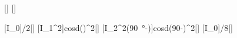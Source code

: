 [\W\per\m\squared]
[\degree]

[I_0]{\IoX/2}[\W\per\m\squared]
[I_1\cos^2\theta]{\IuX*cosd(\alX)^2}[\W\per\m\squared]
[I_2\cos^2\left(\SI{90}{\degree}-\theta\right)]{\IvX*cosd(90-\alX)^2}[\W\per\m\squared]
[I_0]{\IoX/8}[\W\per\m\squared]
